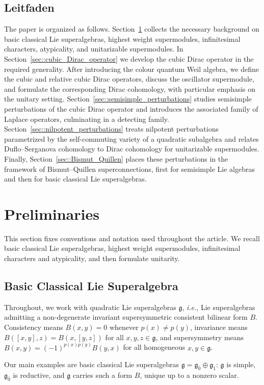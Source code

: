 \documentclass[11pt]{amsart}
\def\even{{\mathfrak{g}_{\bar{0}}}}
\def\odd{{\mathfrak{g}_{\bar{1}}}}
\def\gg{{\mathfrak{g}}}
\theoremstyle{plain}
\theoremstyle{remark}
\theoremstyle{definition}
\numberwithin{equation}{section}
\theoremstyle{remark}
\begin{document}
\subsection{Leitfaden}
The paper is organized as follows. Section~\ref{sec::preliminaries} collects the necessary background on basic classical Lie superalgebras, highest weight supermodules, infinitesimal characters, atypicality, and unitarizable supermodules. In Section~\ref{sec::cubic_Dirac_operator} we develop the cubic Dirac operator in the required generality. After introducing the colour quantum Weil algebra, we define the cubic and relative cubic Dirac operators, discuss the oscillator supermodule, and formulate the corresponding Dirac cohomology, with particular emphasis on the unitary setting. Section~\ref{sec::semisimple_perturbations} studies semisimple perturbations of the cubic Dirac operator and introduces the associated family of Laplace operators, culminating in a detecting family. Section~\ref{sec::nilpotent_perturbations} treats nilpotent perturbations parametrized by the self-commuting variety of a quadratic subalgebra and relates Duflo–Serganova cohomology to Dirac cohomology for unitarizable supermodules. Finally, Section~\ref{sec::Bismut_Quillen} places these perturbations in the framework of Bismut–Quillen superconnections, first for semisimple Lie algebras and then for basic classical Lie superalgebras.


\section{Preliminaries} \label{sec::preliminaries}
This section fixes conventions and notation used throughout the article. We recall basic classical Lie superalgebras, highest weight supermodules, infinitesimal characters and atypicality, and then formulate unitarity.

\subsection{Basic Classical Lie Superalgebra} 
 
Throughout, we work with quadratic Lie superalgebras $\gg$, \emph{i.e.}, Lie superalgebras admitting a non-degenerate invariant supersymmetric consistent bilinear form $B$. Consistency means $B(x,y)=0$ whenever $p(x)\neq p(y)$, invariance means $B([x,y],z)=B(x,[y,z])$ for all $x,y,z\in\gg$, and supersymmetry means $B(x,y)=(-1)^{p(x)p(y)}B(y,x)$ for all homogeneous $x,y\in\gg$.

Our main examples are basic classical Lie superalgebras $\gg=\even\oplus\odd$: $\gg$ is simple, $\even$ is reductive, and $\gg$ carries such a form $B$, unique up to a nonzero scalar.
\end{document}
